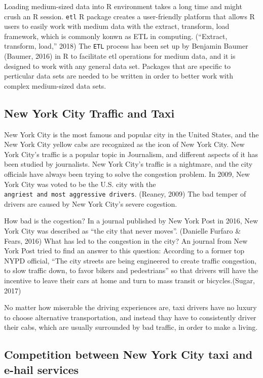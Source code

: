 \documentclass[12pt,twoside]{reedthesis}
\theoremstyle{definition}
\theoremstyle{definition}
\theoremstyle{definition}
\theoremstyle{remark}
\begin{document}
Loading medium-sized data into R environment takes a long time and might
crush an R session. \texttt{etl} R package creates a user-friendly
platform that allows R users to easily work with medium data with the
extract, transform, load framework, which is commonly konwn as ETL in
computing. (``Extract, transform, load,'' 2018) The \texttt{ETL} process
has been set up by Benjamin Baumer (Baumer, 2016) in R to facilitate etl
operations for medium data, and it is designed to work with any general
data set. Packages that are specific to perticular data sets are needed
to be written in order to better work with complex medium-sized data
sets.

\subsection{New York City Traffic and
Taxi}\label{new-york-city-traffic-and-taxi}

New York City is the most famous and popular city in the United States,
and the New York City yellow cabs are recognized as the icon of New York
City. New York City's traffic is a popular topic in Journalism, and
different aspects of it has been studied by journalists. New York City's
traffic is a nightmare, and the city officials have always been trying
to solve the congestion problem. In 2009, New York City was voted to be
the U.S. city with the
\texttt{angriest\ and\ most\ aggressive\ drivers}. (Reaney, 2009) The
bad temper of drivers are caused by New York City's severe cogestion.

How bad is the cogestion? In a journal published by New York Post in
2016, New York City was described as ``the city that never moves''.
(Danielle Furfaro \& Fears, 2016) What has led to the congestion in the
city? An journal from New York Post tried to find an answer to this
question: According to a former top NYPD official, ``The city streets
are being engineered to create traffic congestion, to slow traffic down,
to favor bikers and pedestrians'' so that drivers will have the
incentive to leave their cars at home and turn to mass transit or
bicycles.(Sugar, 2017)

No matter how miserable the driving experiences are, taxi drivers have
no luxury to choose alternative transportation, and instead thay have to
consistently driver their cabs, which are usually surrounded by bad
traffic, in order to make a living.

\subsection{Competition between New York City taxi and e-hail
services}\label{competition-between-new-york-city-taxi-and-e-hail-services}
\end{document}
